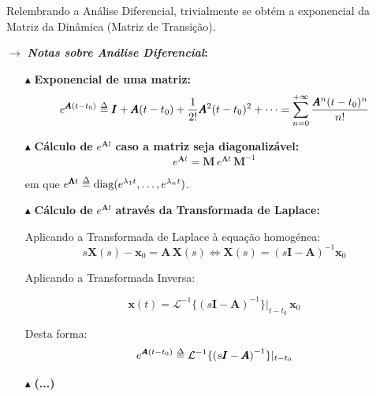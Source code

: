 \noindent Relembrando a Análise Diferencial, trivialmente se obtém a exponencial da Matriz da Dinâmica (Matriz de Transição). 

{

\begin{mdframed}
    \noindent $\pmb{\rightarrow}$ \textbf{\textit{Notas sobre Análise Diferencial}:}
    \begin{itemize}
        \item[$\blacktriangle$] \textbf{Exponencial de uma matriz:}
            \vspace{-0.5em}
            $$
                e^{\pmb{A}(t-t_0)} \delequal \pmb{I} + \pmb{A}(t-t_0) + \frac{1}{2!}\pmb{A}^2(t-t_0)^2 + \dots = \sum_{n=0}^{+\infty} \frac{\pmb{A}^n(t-t_0)^n}{n!}
            $$

        \vspace{-1em}
        \item[$\blacktriangle$] \textbf{Cálculo de} $e^{\pmb{A}t}$ \textbf{caso a matriz seja diagonalizável:}
            \vspace{-0.5em}
            $$
                e^{\pmb{A}t} = \pmb{M}\, e^{\pmb{\Lambda}t}\, \pmb{M}^{-1}
            $$
            
            \vspace{-1.0em}
            \noindent em que $e^{\pmb{\Lambda}t} \delequal \text{diag}(e^{\lambda_1 t}, \dots, e^{\lambda_n t})$.

            \item[$\blacktriangle$] \textbf{Cálculo de} $e^{\pmb{A}t}$ \textbf{através da Transformada de Laplace:}
            
            \noindent Aplicando a Transformada de Laplace à equação homogénea:
            $$
                s\pmb{X}(s) - \pmb{x}_0 = \pmb{A}\,\pmb{X}(s) \iff \pmb{X}(s) = \left( s\pmb{I} -\pmb{A} \right)^{-1} \pmb{x}_0
            $$
            
            \vspace{-0.5em}
            \noindent Aplicando a Transformada Inversa:
            
            \vspace{-0.5em}
            $$
                \pmb{x}(t) = \mathcal{L}^{-1}\{\left( s\pmb{I} -\pmb{A} \right)^{-1}\}\vert_{t-t_0}\, \pmb{x}_0
            $$

            \vspace{-0.5em}
            \noindent Desta forma:
            $$
                e^{\pmb{A}(t-t_0)} \delequal \mathcal{L}^{-1}\{\left( s\pmb{I} -\pmb{A} \right)^{-1}\}\vert_{t-t_0}
            $$

            \vspace{-1em}
            \item[$\blacktriangle$] \textbf{(...)}
    \end{itemize}
    
\end{mdframed}
}

